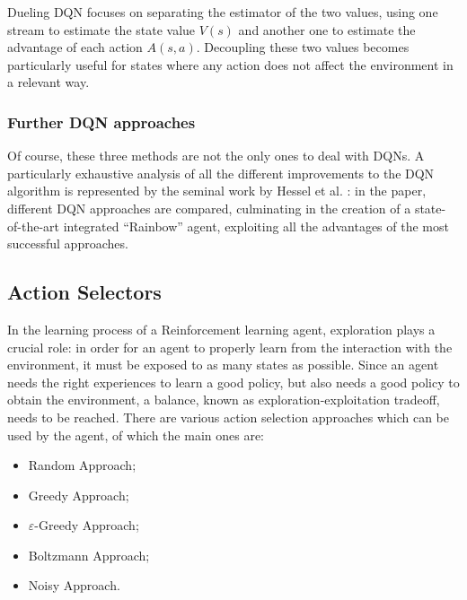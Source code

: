 \documentclass[a4paper, 12pt]{article}
\numberwithin{equation}{section}
\begin{document}
Dueling DQN focuses on separating the estimator of the two values, using one stream to estimate the state value $V\left(s\right)$ and another one to estimate the advantage of each action $A\left(s,a\right)$. Decoupling these two values becomes particularly useful for states where any action does not affect the environment in a relevant way.




\subsubsection{Further DQN approaches}

Of course, these three methods are not the only ones to deal with DQNs. A particularly exhaustive analysis of all the different improvements to the DQN algorithm is represented by the seminal work by Hessel et al. \cite{rainbow}: in the paper, different DQN approaches are compared, culminating in the creation of a state-of-the-art integrated ``Rainbow'' agent, exploiting all the advantages of the most successful approaches.%















\subsection[Action Selectors]{Action Selectors \cite{action-selectors}}\label{sec:action-selectors}
In the learning process of a Reinforcement learning agent, exploration plays a crucial role: in order for an agent to properly learn from the interaction with the environment, it must be exposed to as many states as possible. Since an agent needs the right experiences to learn a good policy, but also needs a good policy to obtain the environment, a balance, known as exploration-exploitation tradeoff, needs to be reached. There are various action selection approaches which can be used by the agent, of which the main ones are:
\begin{itemize}
	\item Random Approach;
	\item Greedy Approach;
	\item $\varepsilon$-Greedy Approach;
	\item Boltzmann Approach;
	\item Noisy Approach.
\end{itemize}
\end{document}
